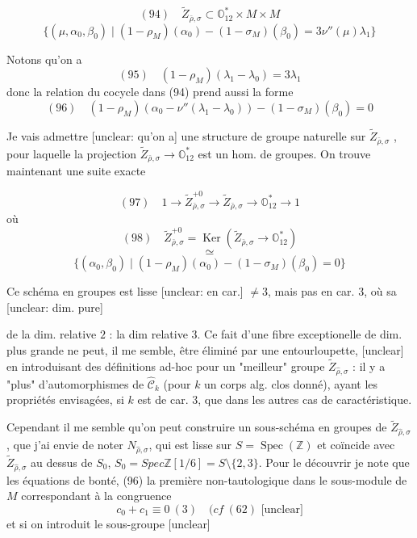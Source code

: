 $$ (94) \quad \widetilde{Z}_{\bar{\rho}, \sigma} \subset \mathbb{O}_{12}^* \times M \times M $$
$$ \{ (\mu, \alpha_0, \beta_0) \mid (1 - \rho_M)(\alpha_0) - (1 - \sigma_M)(\beta_0) = 3 \nu''(\mu)\lambda_1 \} $$

Notons qu'on a
$$ (95) \quad (1 - \rho_M)(\lambda_1 - \lambda_0) = 3 \lambda_1 $$
donc la relation du cocycle dans (94)
prend aussi la forme
$$ (96) \quad (1 - \rho_M)(\alpha_0 - \nu''(\lambda_1 - \lambda_0)) - (1 - \sigma_M)(\beta_0) = 0 $$

Je vais admettre [unclear: qu'on a] une
structure de groupe naturelle sur $\widetilde{Z}_{\bar{\rho}, \sigma}$ ,
pour laquelle la projection $\widetilde{Z}_{\bar{\rho}, \sigma} \to \mathbb{O}_{12}^*$
est un hom. de groupes. On trouve
maintenant une suite exacte

$$ (97) \quad 1 \to \widetilde{Z}_{\bar{\rho}, \sigma}^{+0} \to \widetilde{Z}_{\bar{\rho}, \sigma} \to \mathbb{O}_{12}^* \to 1 $$
où
$$ (98) \quad \widetilde{Z}_{\bar{\rho}, \sigma}^{+0} = \operatorname{Ker}(\widetilde{Z}_{\bar{\rho}, \sigma} \to \mathbb{O}_{12}^*) $$
$$ \simeq $$
$$ \{ (\alpha_0, \beta_0) \mid (1 - \rho_M)(\alpha_0) - (1 - \sigma_M)(\beta_0) = 0 \} $$

Ce schéma en groupes est lisse [unclear: en car.]
$\neq 3$, mais pas en car. 3, où sa [unclear: dim. pure]

\newpage


de la dim. relative $2$ : la dim relative $3$.
Ce fait d'une fibre exceptionelle de dim.
plus grande ne peut, il me semble, être
éliminé par une entourloupette, [unclear] en
introduisant des définitions ad-hoc pour
un "meilleur" groupe $\tilde{Z}_{\hat{\rho}, \sigma}$ : il y a
"plus" d'automorphismes de $\widehat{\mathcal{C}}_k$ (pour $k$
un corps alg. clos donné), ayant les propriétés
envisagées, si $k$ est de car. $3$, que dans les
autres cas de caractéristique.

Cependant il me semble qu'on peut
construire un sous-schéma en groupes de
$\tilde{Z}_{\hat{\rho}, \sigma}$, que j'ai envie de noter
$N_{\hat{\rho}, \sigma}$, qui est lisse sur $S = \operatorname{Spec}(\mathbb{Z})$ et
coïncide avec $\tilde{Z}_{\hat{\rho}, \sigma}$ au dessus de $S_0$,
$S_0 = Spec \mathbb{Z}[1/6] = S \setminus \{2, 3\}$. Pour le découvrir
je note que les équations de bonté, (96)
la première non-tautologique
dans le sous-module de $M$ correspondant
à la congruence
$$c_0 + c_1 \equiv 0 \ (3) \quad (cf \ (62) \text{ [unclear]}$$
et si on introduit le sous-groupe [unclear]

